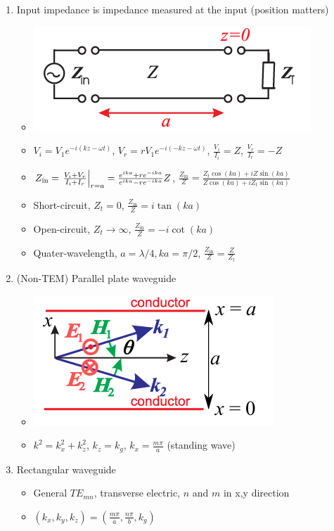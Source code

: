 \documentclass{article}
\theoremstyle{remark}
\theoremstyle{remark}
\begin{document}
\begin{enumerate}
    \item Input impedance is impedance measured at the input (position matters)\begin{itemize}
            \item \includegraphics[width=0.5\linewidth]{input impedance.png}
            \item $V_i=V_1e^{-i(kz-\omega t)}$, $V_r=rV_1e^{-i(-kz-\omega t)}$, $\frac{V_i}{I_i}=Z$, $\frac{V_r}{I_r}=-Z$
            \item $Z_{\text{in}}=\eval{\frac{V_i+V_r}{I_i+I_r}}_{r=a}=\frac{e^{ika}+re^{-ika}}{e^{ika}-re^{-ika}}Z$, $\frac{Z_{\text{in}}}{Z}=\frac{Z_t\cos(ka)+iZ\sin(ka)}{Z\cos(ka)+iZ_t\sin(ka)}$
            \item Short-circuit, $Z_t = 0$, $\frac{Z_{\text{in}}}{Z}=i\tan(ka)$
            \item Open-circuit, $Z_t\rightarrow\infty$, $\frac{Z_{\text{in}}}{Z}=-i\cot(ka)$
            \item Quater-wavelength, $a=\lambda/4, ka=\pi/2$, $\frac{Z_{\text{in}}}{Z}=\frac{Z}{Z_t}$
        \end{itemize}
    \item (Non-TEM) Parallel plate waveguide \begin{itemize}
            \item \includegraphics*[width=0.5\linewidth]{waveguide.png}
            \item $k^2=k_x^2+k_z^2$, $k_z=k_g$, $k_x=\frac{m\pi}{a}$ (standing wave)
        \end{itemize}
    \item Rectangular waveguide\begin{itemize}
            \item General $TE_{mn}$, transverse electric, $n$ and $m$ in x,y direction
            \item $(k_x,k_y,k_z)=\left(\frac{m\pi}{a},\frac{n\pi}{b},k_g\right)$

\end{itemize}
\end{enumerate}
\end{document}

